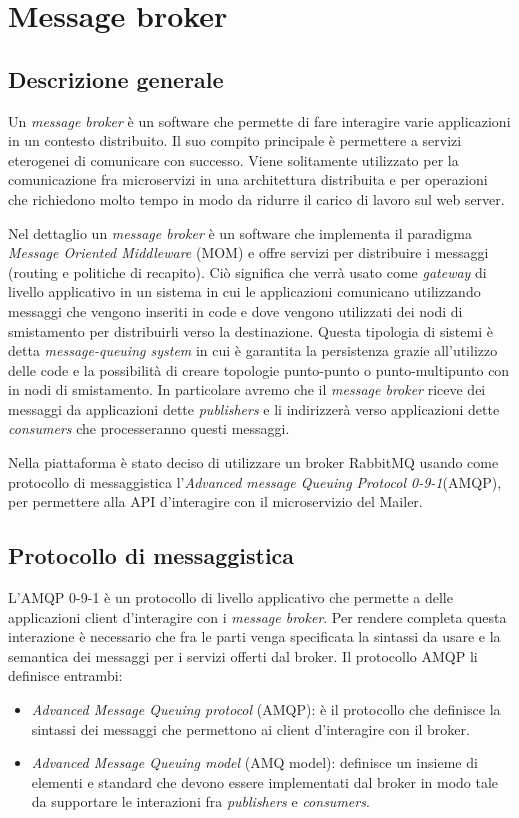 \section{Message broker}
\subsection{Descrizione generale}
Un \textit{message broker} è un software che permette di fare interagire varie applicazioni in
un contesto distribuito. Il suo compito principale è permettere a servizi eterogenei di comunicare con successo.
Viene solitamente utilizzato per la comunicazione fra microservizi in una architettura distribuita
e per operazioni che richiedono molto tempo in modo da ridurre il carico di lavoro sul web server.

Nel dettaglio un \textit{message broker} è un software che implementa il paradigma \textit{Message Oriented Middleware} (MOM) e offre servizi per distribuire i messaggi (routing e politiche di recapito).
Ciò significa che verrà usato come \textit{gateway} di livello applicativo in un sistema in cui le applicazioni comunicano utilizzando messaggi
che vengono inseriti in code e dove vengono utilizzati dei nodi di smistamento per distribuirli verso la destinazione.
Questa tipologia di sistemi è detta \textit{message-queuing system}\cite{MessageBroker-Book} in cui è garantita la persistenza
grazie all'utilizzo delle code e la possibilità di creare topologie punto-punto o punto-multipunto con in nodi di smistamento.
In particolare avremo che il \textit{message broker} riceve dei messaggi da applicazioni dette \textit{publishers} e li indirizzerà verso applicazioni dette \textit{consumers} che processeranno questi messaggi.

Nella piattaforma è stato deciso di utilizzare un broker RabbitMQ\cite{rabbitMQ} usando come protocollo di messaggistica l'\textit{Advanced message Queuing Protocol 0-9-1}(AMQP)\cite{amqp},
per permettere alla API d'interagire con il microservizio del Mailer.

\subsection{Protocollo di messaggistica}
L'AMQP 0-9-1 è un protocollo di livello applicativo che permette a delle applicazioni client d'interagire con i \textit{message broker}.
Per rendere completa questa interazione è necessario che fra le parti venga specificata la sintassi da usare e la semantica dei messaggi per i servizi offerti dal broker.
Il protocollo AMQP li definisce entrambi:
\begin{itemize}
    \item \textit{Advanced Message Queuing protocol} (AMQP): è il protocollo che definisce la sintassi dei messaggi che permettono ai client d'interagire con il broker.
    \item \textit{Advanced Message Queuing model} (AMQ model): definisce un insieme di elementi e standard che devono essere implementati dal broker in modo tale da supportare le interazioni fra \textit{publishers} e \textit{consumers}.
\end{itemize}

